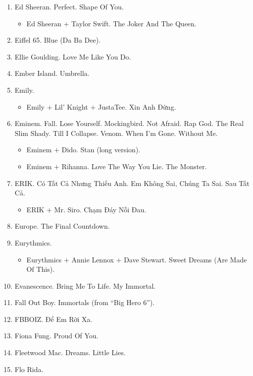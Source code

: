\documentclass{article}
\begin{document}
\begin{enumerate}
	\item {\sc Ed Sheeran.} Perfect. Shape Of You.
	\begin{itemize}
		\item {\sc Ed Sheeran $+$ Taylor Swift.} The Joker And The Queen.
	\end{itemize}
	\item {\sc Eiffel 65.} Blue (Da Ba Dee).
	\item {\sc Ellie Goulding.} Love Me Like You Do.
	\item {\sc Ember Island.} Umbrella.
	\item {\sc Emily.}
	\begin{itemize}
		\item {\sc Emily $+$ Lil' Knight $+$ JustaTee.} Xin Anh Đừng.
	\end{itemize}
	\item {\sc Eminem.} Fall. Lose Yourself. Mockingbird. Not Afraid. Rap God. The Real Slim Shady. Till I Collapse. Venom. When I'm Gone. Without Me.
	\begin{itemize}
		\item {\sc Eminem $+$ Dido.} Stan (long version).
		\item {\sc Eminem $+$ Rihanna.} Love The Way You Lie. The Monster.
	\end{itemize}
	\item {\sc ERIK.} Có Tất Cả Nhưng Thiếu Anh. Em Không Sai, Chúng Ta Sai. Sau Tất Cả.
	\begin{itemize}
		\item {\sc ERIK $+$ Mr. Siro.} Chạm Đáy Nỗi Đau.
	\end{itemize}
	\item {\sc Europe.} The Final Countdown.
	\item {\sc Eurythmics.}
	\begin{itemize}
		\item {\sc Eurythmics $+$ Annie Lennox $+$ Dave Stewart.} Sweet Dreams (Are Made Of This).
	\end{itemize}
	\item {\sc Evanescence.} Bring Me To Life. My Immortal.
	\item {\sc Fall Out Boy.} Immortals (from ``Big Hero 6'').
	\item {\sc FBBOIZ.} Để Em Rời Xa.
	\item {\sc Fiona Fung.} Proud Of You.
	\item {\sc Fleetwood Mac.} Dreams. Little Lies.
	\item {\sc Flo Rida.}
	\begin{itemize}

\end{itemize}
\end{enumerate}
\end{document}
